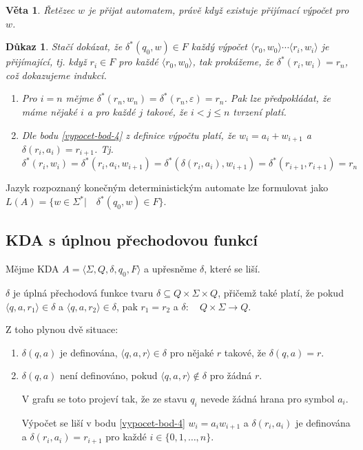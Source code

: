 \documentclass[10pt, a4paper, titlepage]{article}
\theoremstyle{note}
\newtheorem{veta}{Věta}
\newtheorem{dukaz}{Důkaz}
\begin{document}
\begin{veta}
Řetězec $w$ je přijat automatem, právě když existuje přijímací výpočet pro $w$.
\end{veta}

\begin{dukaz}
Stačí dokázat, že $\delta^*(q_0,w) \in F$ každý výpočet $\langle r_0, w_0 \rangle \cdots \langle r_i, w_i \rangle$ je přijímající,
tj. když $r_i \in F$ pro každé $\langle r_0, w_0 \rangle$, tak prokážeme, že $\delta^*(r_i, w_i) = r_n$, což dokazujeme indukcí.
\begin{enumerate}
\item
Pro $i = n$ mějme $\delta^*(r_n,w_n) = \delta^*(r_n, \varepsilon) = r_n$. Pak lze předpokládat, že máme nějaké $i$ a pro každé $j$ takové,
že $i < j \leq n$ tvrzení platí.

\item
Dle bodu \ref{vypocet-bod-4} z definice výpočtu platí, že $w_i = a_i + w_{i+1}$ a $\delta(r_i, a_i) = r_{i+1}$.
Tj.  $\delta^*(r_i,w_i) = \delta^*(r_i,a_i,w_{i+1}) = \delta^*(\delta(r_i, a_i), w_{i+1}) = \delta^*(r_{i+1}, r_{i+1}) = r_n$
\end{enumerate}
\end{dukaz}

Jazyk rozpoznaný konečným deterministickým automate lze formulovat jako
$L(A) = \lbrace w \in \Sigma^* |\quad \delta^*(q_0,w) \in F \rbrace$.

\subsection{KDA s úplnou přechodovou funkcí}

Mějme KDA $A = \langle \Sigma, Q, \delta, q_0, F \rangle$ a upřesněme $\delta$, které se liší.

$\delta$ je úplná přechodová funkce tvaru $\delta \subseteq Q \times \Sigma \times Q$, přičemž také platí, že
pokud $\langle q, a, r_1 \rangle \in \delta$ a $\langle q,a,r_2 \rangle \in \delta$, pak $r_1 = r_2$ a $\delta:\quad Q \times \Sigma \rightarrow Q$.

Z toho plynou dvě situace:
\begin{enumerate}
\item
$\delta(q, a)$ je definována, $\langle q,a,r \rangle \in \delta$ pro nějaké $r$ takové, že $\delta(q,a) = r$.

\item
$\delta(q,a)$ není definováno, pokud $\langle q, a, r \rangle \notin \delta$ pro žádná $r$.

V grafu se toto projeví tak, že ze stavu $q_i$ nevede žádná hrana pro symbol $a_i$.

Výpočet se liší v bodu \ref{vypocet-bod-4} $w_i = a_i w_{i+1}$ a $\delta(r_i, a_i)$ je definována a $\delta(r_i,a_i) = r_{i+1}$
pro každé $i \in \lbrace 0,1,\ldots,n \rbrace$.
\end{enumerate}
\end{document}
